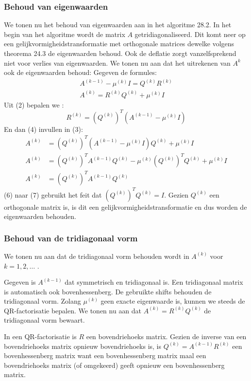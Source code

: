\documentclass[a4paper]{article}
\begin{document}
\subsubsection{Behoud van eigenwaarden}
	We tonen nu het behoud van eigenwaarden aan in het algoritme 28.2.
	In het begin van het algoritme wordt de matrix $A$ getridiagonaliseerd. Dit komt neer op een gelijkvormigheidstransformatie met orthogonale matrices dewelke volgens theorema 24.3 de eigenwaarden behoud.
	Ook de deflatie zorgt vanzelfsprekend niet voor verlies van eigenwaarden.
	We tonen nu aan dat het uitrekenen van $A^{k}$ ook de eigenwaarden behoud:
	Gegeven de formules:
	\begin{gather}
		A^{(k-1)} - \mu ^{(k)}I = Q^{(k)}R^{(k)} \\
		A^{(k)} = R^{(k)}Q^{(k)} + \mu ^{(k)}I
	\end{gather}
	Uit (2) bepalen we :
	\begin{equation}
		R^{(k)} = (Q^{(k)})^T(A^{(k-1)}-\mu ^{(k)}I)		
	\end{equation}
	En dan (4) invullen in (3):
	\begin{align}
		A^{(k)} &= (Q^{(k)})^T(A^{(k-1)} - \mu ^{(k)}I)Q^{(k)} + \mu ^{(k)}I\\
		A^{(k)} &= (Q^{(k)})^TA^{(k-1)}Q^{(k)} - \mu ^{(k)}(Q^{(k)})^TQ^{(k)} + \mu ^{(k)}I\\
		A^{(k)} &= (Q^{(k)})^TA^{(k-1)}Q^{(k)}
	\end{align}
	(6) naar (7) gebruikt het feit dat $(Q^{(k)})^TQ^{(k)} = I$.
	Gezien $Q^{(k)}$ een orthogonale matrix is, is dit een gelijkvormigheidstransformatie en dus worden de eigenwaarden behouden.
	
\subsubsection{Behoud van de tridiagonaal vorm}
	We tonen nu aan dat de tridiagonaal vorm behouden wordt in $A^{(k)}$ voor $k = 1,2,\dots$ .
	
	\noindent Gegeven is $A^{(k-1)}$ dat symmetrisch en tridiagonaal is. Een tridiagonaal matrix is automatisch ook bovenhessenberg.
	De gebruikte shifts behouden de tridiagonaal vorm. Zolang $\mu ^{(k)}$ geen exacte eigenwaarde is, kunnen we steeds de QR-factorisatie bepalen. We tonen nu aan dat $A^{(k)} = R^{(k)}Q^{(k)}$ de tridiagonaal vorm bewaart.
	
	\noindent In een QR-factorisatie is $R$ een bovendriehoeks matrix. Gezien de inverse van een bovendriehoeks matrix opnieuw bovendriehoeks is, is $Q^{(k)} = A^{(k-1)}R^{(k)}$ een bovenhessenberg matrix want een bovenhessenberg matrix maal een bovendriehoeks matrix (of omgekeerd) geeft opnieuw een bovenhessenberg matrix.
	
\end{document}
